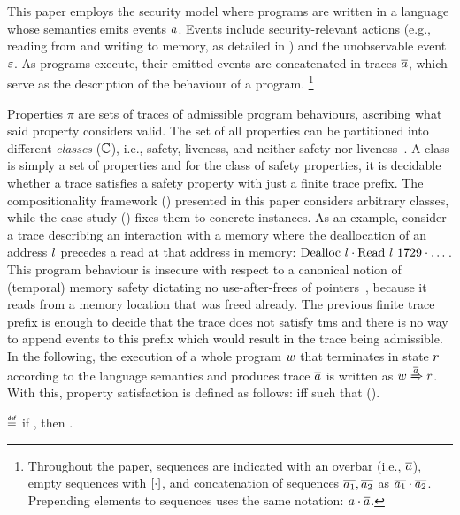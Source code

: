 \documentclass[dvipsnames]{llncs}
\begin{document}
This paper employs the security model where programs are written in a language whose semantics emits events $\event$.
Events include security-relevant actions (e.g., reading from and writing to memory, as detailed in ) and the unobservable event $\emptyevent$.
As programs execute, their emitted events are concatenated in traces $\trace$, which serve as the description of the behaviour of a program.%
\footnote{
Throughout the paper, sequences are indicated with an overbar (i.e., $\trace$), empty sequences with $\hole{\cdot}$, and concatenation of sequences $\trace[_{1}],\trace[_{2}]$ as $\trace[_{1}]\cdot\trace[_{2}]$.
Prepending elements to sequences uses the same notation: $\event\cdot\trace$.
}

Properties $\pi$ are sets of traces of admissible program behaviours, ascribing what said property considers valid.
The set of all properties can be partitioned into different {\em classes} ($\class$), i.e., safety, liveness, and neither safety nor liveness~\cite{clarkson2008hyper}.
A class is simply a set of properties and for the class of safety properties, it is decidable whether a trace satisfies a safety property with just a finite trace prefix.
The compositionality framework () presented in this paper considers arbitrary classes, while the case-study () fixes them to concrete instances.
As an example, consider a trace describing an interaction with a memory where the deallocation of an address $\loc$ precedes a read at that address in memory: $\ev{Dealloc\ \loc}\cdot\ev{Read\ \loc\ 1729}\cdot\dots$.
This program behaviour is insecure with respect to a canonical notion of (temporal) memory safety dictating no use-after-frees of pointers~\cite{nagarakatte2010cets,azevedo2018meaningsofms}, because it reads from a memory location that was freed already.
The previous finite trace prefix is enough to decide that the trace does not satisfy \gls*{tms} and there is no way to append events to this prefix which would result in the trace being admissible.
In the following, the execution of a whole program $\wholeprogvar$ that terminates in state $\runtimetermvar$ according to the language semantics and produces trace $\trace$ is written as $\progstepto{\wholeprogvar}{\runtimetermvar}{\trace}$.
With this, property satisfaction is defined as follows:
 iff  such that  ().

\begin{definition}\label{def:propsat}
    \bul{$\sat{\progvar}{\pi}$}
    $\isdef$
    if \iul{$\forall\runtimetermvar\ \trace,\progstepto{\progvar}{\runtimetermvar}{\trace}$},
    then \oul{$\trace\in\pi$}.
\end{definition}
\end{document}
